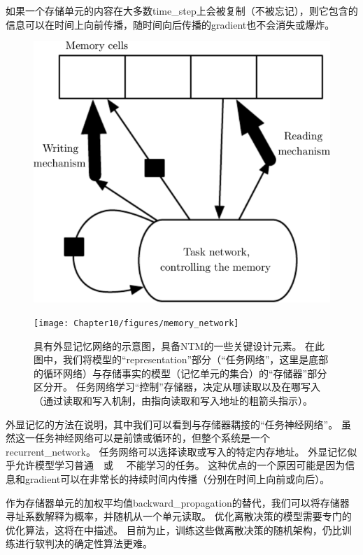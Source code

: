 如果一个存储单元的内容在大多数\gls{time_step}上会被复制（不被忘记），则它包含的信息可以在时间上向前传播，随时间向后传播的\gls{gradient}也不会消失或爆炸。

\begin{figure}[!htb]
\ifOpenSource
\centerline{\includegraphics[scale=0.5]{images/106.png}}
\else
\centerline{\texttt{[image: Chapter10/figures/memory\_network]}}
\fi
\caption{具有外显记忆网络的示意图，具备\gls{NTM}的一些关键设计元素。
在此图中，我们将模型的``\gls{representation}''部分（``任务网络''，这里是底部的循环网络）与存储事实的模型（记忆单元的集合）的``存储器''部分区分开。
任务网络学习``控制''存储器，决定从哪读取以及在哪写入（通过读取和写入机制，由指向读取和写入地址的粗箭头指示）。
}
\label{fig:chap10_memory_network}
\end{figure}

外显记忆的方法在说明，其中我们可以看到与存储器耦接的``任务神经网络''。
虽然这一任务神经网络可以是前馈或循环的，但整个系统是一个\gls{recurrent_network}。
任务网络可以选择读取或写入的特定内存地址。
外显记忆似乎允许模型学习普通~~或~ ~不能学习的任务。
这种优点的一个原因可能是因为信息和\gls{gradient}可以在非常长的持续时间内传播（分别在时间上向前或向后）。


作为存储器单元的加权平均值\gls{backward_propagation}的替代，我们可以将存储器寻址系数解释为概率，并随机从一个单元读取\citep{Zaremba-Sutskever-2015}。
优化离散决策的模型需要专门的优化算法，这将在中描述。
目前为止，训练这些做离散决策的随机架构，仍比训练进行软判决的确定性算法更难。

